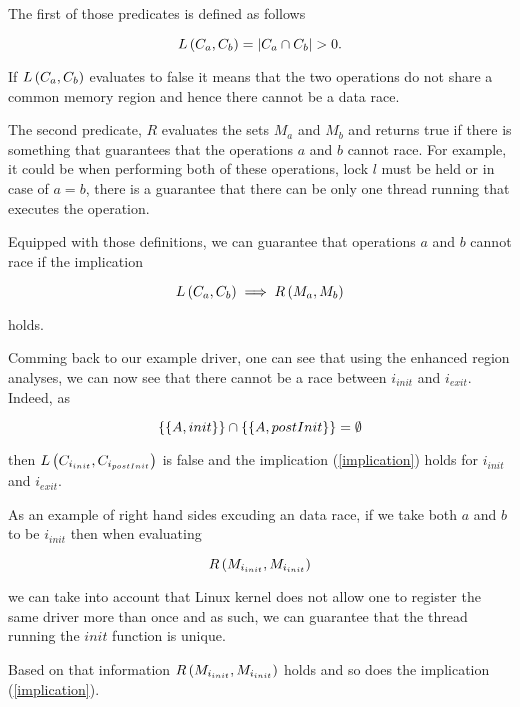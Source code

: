 \documentclass[..thesis.tex]{subfiles}
\begin{document}
The first of those predicates is defined as follows

\begin{equation*}
L \left( C_a, C_b \right) = \left| C_a \cap C_b \right| > 0 \text{.}
\end{equation*}

If $L \left( C_a, C_b \right)$ evaluates to false it means that the two operations do not share a common memory region and hence there cannot be a data race. 

The second predicate, $R$ evaluates the sets $M_a$ and $M_b$ and returns true if there is something that guarantees that the operations $a$ and $b$ cannot race. For example, it could be when performing both of these operations, lock $l$ must be held or in case of $a=b$, there is a guarantee that there can be only one thread running that executes the operation.

Equipped with those definitions, we can guarantee that operations $a$ and $b$ cannot race if the implication

\begin{equation}
\label{implication}
L \left( C_a, C_b \right) \implies R \left( M_a, M_b \right)  
\end{equation}

holds.

Comming back to our example driver, one can see that using the enhanced region analyses, we can now see that there cannot be a race between $i_{init}$ and $i_{exit}$. Indeed, as

\begin{equation*}
 \left\lbrace \left\lbrace A, init \right\rbrace \right\rbrace \cap  \left\lbrace \left\lbrace A, postInit \right\rbrace \right\rbrace = \emptyset
\end{equation*}

then $L \left( C_{i_{init}}, C_{i_{postInit}} \right)$ is false and the implication (\ref{implication}) holds for $i_{init}$ and $i_{exit}$.

As an example of right hand sides excuding an data race, if we take both $a$ and $b$ to be $i_{init}$ then when evaluating 

\begin{equation*}
R \left( M_{i_{init}}, M_{i_{init}} \right)
\end{equation*} 

we can take into account that Linux kernel does not allow one to register the same driver more than once and as such, we can guarantee that the thread running the $init$ function is unique.

Based on that information $R \left( M_{i_{init}}, M_{i_{init}} \right)$ holds and so does the implication (\ref{implication}).
\end{document}
